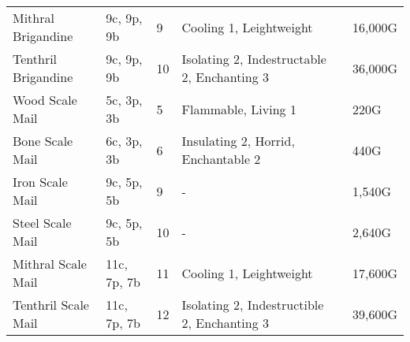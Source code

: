\begin{longtable}{p{3.5cm} | p{1.5cm} | p{0.75cm} | p{4cm} | p{1cm} | p{1.25cm}}
	Mithral Brigandine & 9c, 9p, 9b & 9 & Cooling 1, Leightweight &  & 16,000G\\
	
	Tenthril Brigandine & 9c, 9p, 9b & 10 & Isolating 2, Indestructable 2, Enchanting 3 &  & 36,000G\\
	
	Wood Scale Mail & 5c, 3p, 3b & 5 & Flammable, Living 1 &  & 220G\\
	
	Bone Scale Mail & 6c, 3p, 3b & 6 & Insulating 2, Horrid, Enchantable 2 &  & 440G\\
	
	Iron Scale Mail & 9c, 5p, 5b & 9 & - &  & 1,540G\\
	
	Steel Scale Mail & 9c, 5p, 5b & 10 & - &  & 2,640G\\
	
	Mithral Scale Mail & 11c, 7p, 7b & 11 & Cooling 1, Leightweight &  & 17,600G\\
	
	Tenthril Scale Mail & 11c, 7p, 7b & 12 & Isolating 2, Indestructible 2, Enchanting 3 &  & 39,600G\\
\end{longtable}